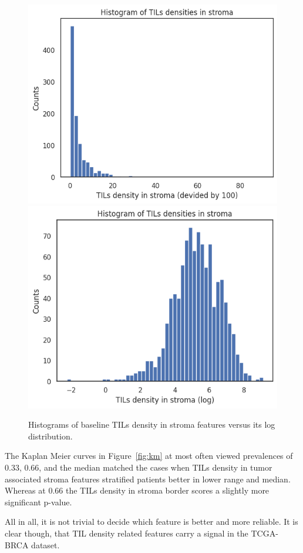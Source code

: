 \begin{figure}[H]
\centering
\includegraphics[width=0.4\linewidth]{figures/survival/histo_tils.png}
\includegraphics[width=0.4\linewidth]{figures/survival/histo_tils_log.png}
\caption{Histograms of baseline TILs density in stroma features versus its log distribution.}
\label{fig:histo_tils}
\end{figure}
    

The Kaplan Meier curves in Figure~\ref{fig:km} at most often viewed prevalences of
0.33, 0.66, and the median matched the cases when TILs density in tumor associated
stroma features stratified patients better in lower range and median.
Whereas at 0.66 the TILs density in stroma border scores a slightly more significant p-value.

All in all, it is not trivial to decide which feature is better and more reliable.
It is clear though, that TIL density related features carry a signal in the TCGA-BRCA dataset.



